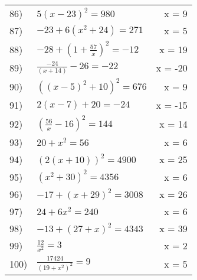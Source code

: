 \documentclass{article}
\begin{document}
\begin{longtable}{l p{} r}
86) & $5{ (x - 23) }^2 = 980$ & x = 9 \\ 
87) & $-23 + 6({ x }^2 + 24) = 271$ & x = 5 \\ 
88) & $-28 + { (1 + \frac{ 57 }{ x }) }^2 = -12$ & x = 19 \\ 
89) & $\frac{ -24 }{ (x + 14) } - 26 = -22$ & x = -20 \\ 
90) & ${ ({ (x - 5) }^2 + 10) }^2 = 676$ & x = 9 \\ 
91) & $2(x - 7) + 20 = -24$ & x = -15 \\ 
92) & ${ (\frac{ 56 }{ x } - 16) }^2 = 144$ & x = 14 \\ 
93) & $20 + { x }^2 = 56$ & x = 6 \\ 
94) & ${ (2(x + 10)) }^2 = 4900$ & x = 25 \\ 
95) & ${ ({ x }^2 + 30) }^2 = 4356$ & x = 6 \\ 
96) & $-17 + { (x + 29) }^2 = 3008$ & x = 26 \\ 
97) & $24 + 6{ x }^2 = 240$ & x = 6 \\ 
98) & $-13 + { (27 + x) }^2 = 4343$ & x = 39 \\ 
99) & $\frac{ 12 }{ { x }^2 } = 3$ & x = 2 \\ 
100) & $\frac{ 17424 }{ { (19 + { x }^2) }^2 } = 9$ & x = 5 
\end{longtable}
\end{document}
